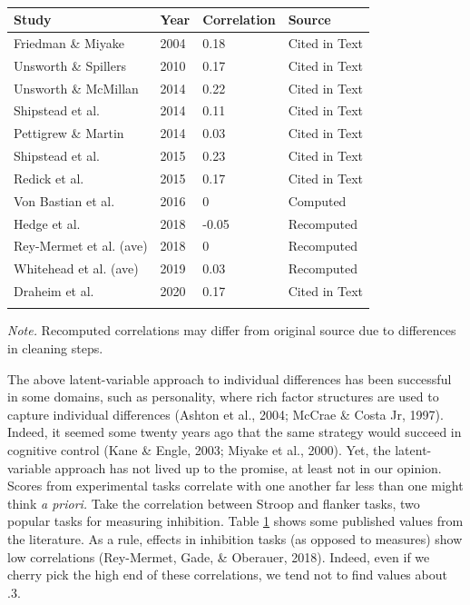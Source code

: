 \documentclass[
  ,man]{apa6}
\begin{document}
\begin{table}[tbp]

\begin{center}
\begin{threeparttable}

\caption{\label{tab:corTab}}

\begin{tabular}{llll}
\toprule
Study & Year & Correlation & Source\\
\midrule
Friedman \& Miyake & 2004 & 0.18 & Cited in Text\\
Unsworth \& Spillers & 2010 & 0.17 & Cited in Text\\
Unsworth \& McMillan & 2014 & 0.22 & Cited in Text\\
Shipstead et al. & 2014 & 0.11 & Cited in Text\\
Pettigrew \& Martin & 2014 & 0.03 & Cited in Text\\
Shipstead et al. & 2015 & 0.23 & Cited in Text\\
Redick et al. & 2015 & 0.17 & Cited in Text\\
Von Bastian et al. & 2016 & 0 & Computed\\
Hedge et al. & 2018 & -0.05 & Recomputed\\
Rey-Mermet et al. (ave) & 2018 & 0 & Recomputed\\
Whitehead et al. (ave) & 2019 & 0.03 & Recomputed\\
Draheim et al. & 2020 & 0.17 & Cited in Text\\
\bottomrule
\addlinespace
\end{tabular}

\begin{tablenotes}[para]
\normalsize{\textit{Note.} Recomputed correlations may differ from original source due to differences in cleaning steps.}
\end{tablenotes}

\end{threeparttable}
\end{center}

\end{table}

The above latent-variable approach to individual differences has been successful in some domains, such as personality, where rich factor structures are used to capture individual differences (Ashton et al., 2004; McCrae \& Costa Jr, 1997). Indeed, it seemed some twenty years ago that the same strategy would succeed in cognitive control (Kane \& Engle, 2003; Miyake et al., 2000). Yet, the latent-variable approach has not lived up to the promise, at least not in our opinion. Scores from experimental tasks correlate with one another far less than one might think \emph{a priori.} Take the correlation between Stroop and flanker tasks, two popular tasks for measuring inhibition. Table \ref{tab:corTab} shows some published values from the literature. As a rule, effects in inhibition tasks (as opposed to measures) show low correlations (Rey-Mermet, Gade, \& Oberauer, 2018). Indeed, even if we cherry pick the high end of these correlations, we tend not to find values about .3.
\end{document}

